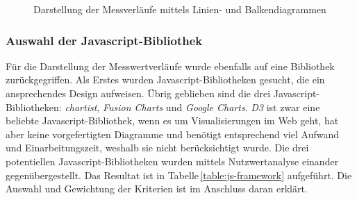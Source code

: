 
\begin{figure}[h!]
	\centering
	\caption{Darstellung der Messverläufe mittels Linien- und Balkendiagrammen}
	\label{img:charts}
\end{figure}


\subsubsection{Auswahl der Javascript-Bibliothek}
Für die Darstellung der Messwertverläufe wurde ebenfalls auf eine Bibliothek zurückgegriffen. Als Erstes wurden Javascript-Bibliotheken gesucht, die ein ansprechendes Design aufweisen. Übrig geblieben sind die drei Javascript-Bibliotheken: \emph{chartist}, \emph{Fusion Charts} und \emph{Google Charts}. \emph{D3} ist zwar eine beliebte Javascript-Bibliothek, wenn es um Visualisierungen im Web geht, hat aber keine vorgefertigten Diagramme und benötigt entsprechend viel Aufwand und Einarbeitungszeit, weshalb sie nicht berücksichtigt wurde. Die drei potentiellen Javascript-Bibliotheken wurden mittels Nutzwertanalyse einander gegenübergestellt. Das Resultat ist in Tabelle\,\ref{table:js-framework} aufgeführt. Die Auswahl und Gewichtung der Kriterien ist im Anschluss daran erklärt.

